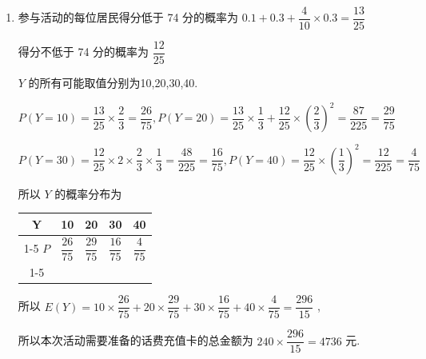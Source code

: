 \begin{enumerate}
\begin{enumerate}
\begin{jieda}
\begin{enumerate}
                故 $P\left( {{66} < X \leq  {90}}\right)  = P\left( {\mu  - \sigma  < X \leq  \mu  + {2\sigma }}\right)$
                
                $= \dfrac{P\left( {\mu  - \sigma  < X \leq  \mu  + \sigma }\right)  + P\left( {\mu  - {2\sigma } < X \leq  \mu  + {2\sigma }}\right) }{2} = \dfrac{{0.6827} + {0.9545}}{2} = \dfrac{1.6372}{2}  = {0.8186}$ .
                
                \item 参与活动的每位居民得分低于 74 分的概率为 ${0.1} + {0.3} + \dfrac{4}{10} \times  {0.3} = \dfrac{13}{25}$
                
                得分不低于 74 分的概率为 $\dfrac{12}{25}$
                
                $Y$ 的所有可能取值分别为10,20,30,40.
                
                $P\left( {Y = {10}}\right)  = \dfrac{13}{25} \times  \dfrac{2}{3} = \dfrac{26}{75},P\left( {Y = {20}}\right)  = \dfrac{13}{25} \times  \dfrac{1}{3} + \dfrac{12}{25} \times  {\left( \dfrac{2}{3}\right) }^{2} = \dfrac{87}{225} = \dfrac{29}{75}$
                
                $P\left( {Y = {30}}\right)  = \dfrac{12}{25} \times  2 \times  \dfrac{2}{3} \times  \dfrac{1}{3} = \dfrac{48}{225} = \dfrac{16}{75},P\left( {Y = {40}}\right)  = \dfrac{12}{25} \times  {\left( \dfrac{1}{3}\right) }^{2} = \dfrac{12}{225} = \dfrac{4}{75}$
                
                所以 $Y$ 的概率分布为
                
                \begin{center}
                \begin{tabular}{|c|c|c|c|c|}
                \hline
                Y & 10 & 20 & 30 & 40 \\
                \cline{1-5}
                $P$ & $\dfrac{26}{75}$ & $\dfrac{29}{75}$ & $\dfrac{16}{75}$ & $\dfrac{4}{75}$ \\
                \cline{1-5}
                \hline
                \end{tabular}
                \end{center}
                
                所以 $E\left( Y\right)  = {10} \times  \dfrac{26}{75} + {20} \times  \dfrac{29}{75} + {30} \times  \dfrac{16}{75} + {40} \times  \dfrac{4}{75} = \dfrac{296}{15}$ ,
                
                所以本次活动需要准备的话费充值卡的总金额为 ${240} \times  \dfrac{296}{15} = {4736}$ 元.
            \end{enumerate}
        \end{jieda}
        

\end{enumerate}
\end{enumerate}

